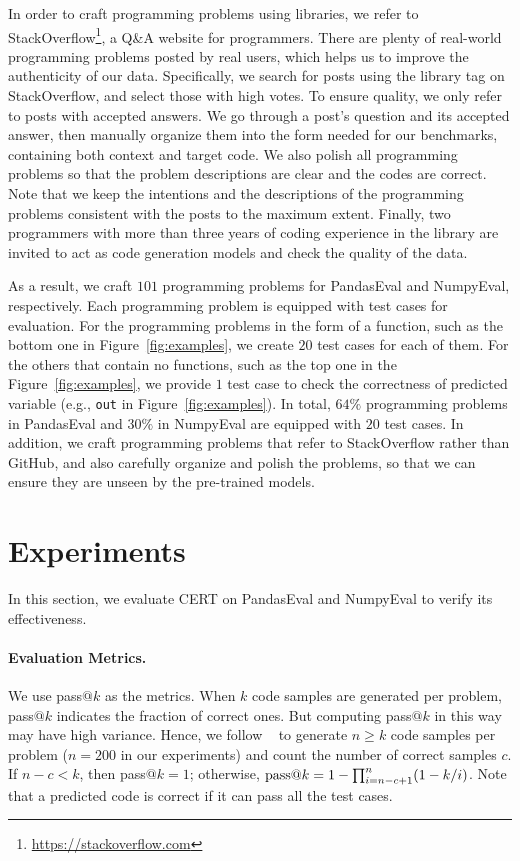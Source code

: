 \documentclass{article}
\newcommand{\cert}{\textsc{CERT}\xspace}
\newcommand{\peval}{PandasEval\xspace}
\newcommand{\neval}{NumpyEval\xspace}
\newcommand{\citet}[1] {\citeauthor{#1}~\shortcite{#1}}
\begin{document}
In order to craft programming problems using libraries, we refer to StackOverflow\footnote{\url{https://stackoverflow.com}}, a Q\&A website for programmers.
There are plenty of real-world programming problems posted by real users, which helps us to improve the authenticity of our data. 
Specifically, we search for posts using the library tag on StackOverflow, and select those with high votes. To ensure quality, we only refer to posts with accepted answers. We go through a post's question and its accepted answer, then manually organize them into the form needed for our benchmarks, containing both context and target code. We also polish all programming problems so that the problem descriptions are clear and the codes are correct. Note that we keep the intentions and the descriptions of the programming problems consistent with the posts to the maximum extent.
Finally, two programmers with more than three years of coding experience in the library are invited to act as code generation models and check the quality of the data.

As a result, we craft $101$ programming problems for \peval and \neval, respectively. 
Each programming problem is equipped with test cases for evaluation. 
For the programming problems in the form of a function, such as the bottom one in Figure~\ref{fig:examples}, we create $20$ test cases for each of them. For the others that contain no functions, such as the top one in the Figure~\ref{fig:examples}, we provide $1$ test case to check the correctness of predicted variable (e.g., \texttt{out} in Figure~\ref{fig:examples}). 
In total, $64\%$ programming problems in \peval and $30\%$ in \neval are equipped with $20$ test cases.
In addition, we craft programming problems that refer to StackOverflow rather than GitHub, and also carefully organize and polish the problems, so that we can ensure they are unseen by the pre-trained models.

\section{Experiments} \label{experiments}
In this section, we evaluate \cert on \peval and \neval to verify its effectiveness.

\paragraph{Evaluation Metrics.}
We use pass$@k$ as the metrics. When $k$ code samples are generated per problem, pass$@k$ indicates the fraction of correct ones. But computing pass$@k$ in this way may have high variance. Hence, we follow \citet{chen2021evaluating} to generate $n\ge k$ code samples per problem ($n=200$ in our experiments) and count the number of correct samples $c$. If $n-c<k$, then pass$@k=1$; otherwise, ${\rm{pass}}@k=1-\prod\nolimits_{i=n-c+1}^{n} (1-k/i)$. 
Note that a predicted code is correct if it can pass all the test cases.
\end{document}

